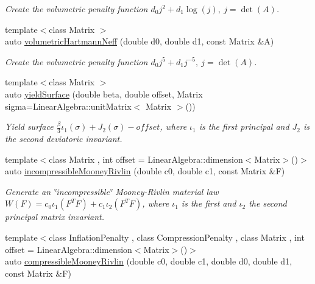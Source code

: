 \begin{DoxyCompactItemize}
\begin{DoxyCompactList}\small\item\em Create the volumetric penalty function $ d_0 j^2 + d_1 \log(j),\ j=\det(A) $. \end{DoxyCompactList}\item 
\hypertarget{namespaceFunG_adf4be5df85ea9df10cc9e11c11aaeb7b}{{\footnotesize template$<$class Matrix $>$ }\\auto \hyperlink{namespaceFunG_adf4be5df85ea9df10cc9e11c11aaeb7b}{volumetric\-Hartmann\-Neff} (double d0, double d1, const Matrix \&A)}\label{namespaceFunG_adf4be5df85ea9df10cc9e11c11aaeb7b}

\begin{DoxyCompactList}\small\item\em Create the volumetric penalty function $ d_0 j^5 + d_1 j^{-5},\ j=\det(A) $. \end{DoxyCompactList}\item 
\hypertarget{namespaceFunG_a4784211358c877f05ad9426850303273}{{\footnotesize template$<$class Matrix $>$ }\\auto \hyperlink{namespaceFunG_a4784211358c877f05ad9426850303273}{yield\-Surface} (double beta, double offset, Matrix sigma=Linear\-Algebra\-::unit\-Matrix$<$ Matrix $>$())}\label{namespaceFunG_a4784211358c877f05ad9426850303273}

\begin{DoxyCompactList}\small\item\em Yield surface $ \frac{\beta}{3}\iota_1(\sigma) + J_2(\sigma)-offset $, where $\iota_1$ is the first principal and $J_2$ is the second deviatoric invariant. \end{DoxyCompactList}\item 
\hypertarget{group__Rubber_gace19173e33490aadd36ae3a03fd1d85c}{{\footnotesize template$<$class Matrix , int offset = Linear\-Algebra\-::dimension$<$\-Matrix$>$()$>$ }\\auto \hyperlink{group__Rubber_gace19173e33490aadd36ae3a03fd1d85c}{incompressible\-Mooney\-Rivlin} (double c0, double c1, const Matrix \&F)}\label{group__Rubber_gace19173e33490aadd36ae3a03fd1d85c}

\begin{DoxyCompactList}\small\item\em Generate an \char`\"{}incompressible\char`\"{} Mooney-\/\-Rivlin material law $ W(F)=c_0\iota_1(F^T F) + c_1\iota_2(F^T F) $, where $\iota_1$ is the first and $\iota_2$ the second principal matrix invariant. \end{DoxyCompactList}\item 
\hypertarget{group__Rubber_ga9a1894daa10a0bdcc620c6c41ecb6f19}{{\footnotesize template$<$class Inflation\-Penalty , class Compression\-Penalty , class Matrix , int offset = Linear\-Algebra\-::dimension$<$\-Matrix$>$()$>$ }\\auto \hyperlink{group__Rubber_ga9a1894daa10a0bdcc620c6c41ecb6f19}{compressible\-Mooney\-Rivlin} (double c0, double c1, double d0, double d1, const Matrix \&F)}\label{group__Rubber_ga9a1894daa10a0bdcc620c6c41ecb6f19}


\end{DoxyCompactItemize}
